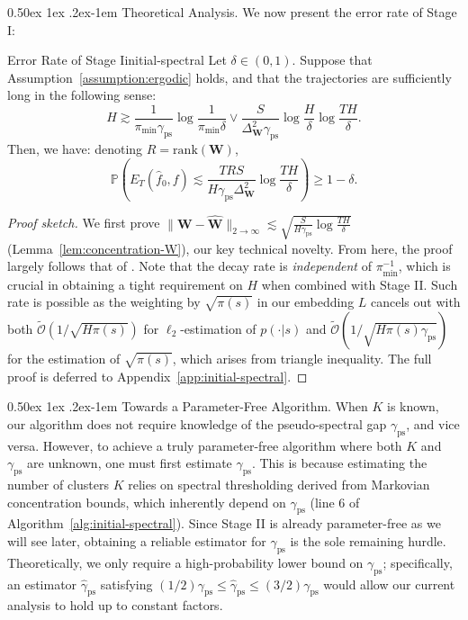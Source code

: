 \documentclass[twoside]{article}
\makeatletter
\renewcommand{\paragraph}{%
  \@startsection{paragraph}{4}%
  {\z@}{0.50ex \@plus 1ex \@minus .2ex}{-1em}%
  {\normalfont\normalsize\bfseries}%
}
\def\mW{{\bm{W}}}
\def\gO{{\mathcal{O}}}
\def\sP{{\mathbb{P}}}
\theoremstyle{plain}
\newcommand{\rank}{\mathrm{rank}}
\newcommand{\ps}{\mathrm{ps}}
\makeatother
\begin{document}
\paragraph{Theoretical Analysis.}
We now present the error rate of Stage I:
\begin{theorem}{Error Rate of Stage I}{initial-spectral}
    Let $\delta \in (0, 1)$.
    Suppose that Assumption~\ref{assumption:ergodic} holds, and that the trajectories are sufficiently long in the following sense:
    \begin{equation*}
        H \gtrsim \frac{1}{\pi_{\min} \gamma_\ps} \log\frac{1}{\pi_{\min} \delta} \vee \frac{S}{\Delta_\mW^2 \gamma_\ps} \log\frac{H}{\delta} \log\frac{TH}{\delta}.
    \end{equation*}
    Then, we have:
    denoting $R = \rank(\mW)$,
    \begin{equation*}
        \sP\left( E_T(\widehat{f}_0, f) \lesssim \frac{T R S}{H \gamma_\ps \Delta_\mW^2} \log\frac{TH}{\delta} \right) \geq 1 - \delta.
    \end{equation*}
\end{theorem}
\begin{proof}[Proof sketch]
    We first prove $\|\mW - \widehat{\mW}\|_{2 \rightarrow \infty} \lesssim \sqrt{\tfrac{S}{H \gamma_\ps} \log\tfrac{T H}{\delta}}$ (Lemma~\ref{lem:concentration-W}), our key technical novelty.
    From here, the proof largely follows that of \citet[Algorithm 2]{yun2016labeled}.
    Note that the decay rate is \textit{independent} of $\pi_{\min}^{-1}$, which is crucial in obtaining a tight requirement on $H$ when combined with Stage II.
    Such rate is possible as the weighting by $\sqrt{\pi(s)}$ in our embedding $L$ cancels out with both $\widetilde{\gO}\left(1 / \sqrt{H \pi(s)}\right)$ for $\ell_2$-estimation of $p(\cdot | s)$ and $\widetilde{\gO}\left(1 / \sqrt{H \pi(s) \gamma_\ps}\right)$ for the estimation of $\sqrt{\pi(s)}$, which arises from triangle inequality.
    The full proof is deferred to Appendix~\ref{app:initial-spectral}.
\end{proof}


\paragraph{Towards a Parameter-Free Algorithm.}
When $K$ is known, our algorithm does not require knowledge of the pseudo-spectral gap $\gamma_\ps$, and vice versa.
However, to achieve a truly parameter-free algorithm where both $K$ and $\gamma_\ps$ are unknown, one must first estimate $\gamma_\ps$. 
This is because estimating the number of clusters $K$ relies on spectral thresholding derived from Markovian concentration bounds, which inherently depend on $\gamma_\ps$ (line 6 of Algorithm~\ref{alg:initial-spectral}).
Since Stage II is already parameter-free as we will see later, obtaining a reliable estimator for $\gamma_\ps$ is the sole remaining hurdle.
Theoretically, we only require a high-probability lower bound on $\gamma_\ps$; specifically, an estimator $\hat{\gamma}_\ps$ satisfying  $(1/2)\gamma_\ps \le \hat{\gamma}_\ps \le (3/2)\gamma_\ps$ would allow our current analysis to hold up to constant factors.
\end{document}
